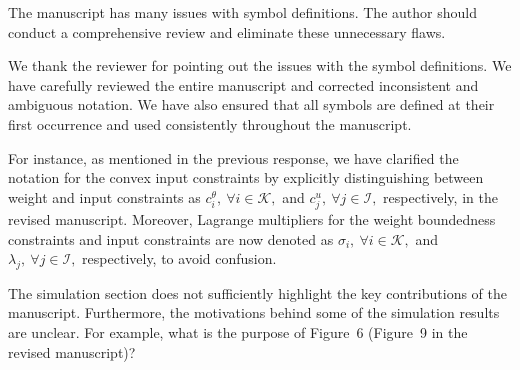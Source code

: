\documentclass[12pt,english]{reviewresponse}
\begin{document}
% 
\begin{revcomment}[3][1]{}
	The manuscript has many issues with symbol definitions. The author should conduct a comprehensive review and eliminate these unnecessary flaws.
\end{revcomment}

\begin{revresponse}
  We thank the reviewer for pointing out the issues with the symbol definitions. 
  We have carefully reviewed the entire manuscript and corrected inconsistent and ambiguous notation. 
  We have also ensured that all symbols are defined at their first occurrence and used consistently throughout the manuscript.

  \bigskip

  For instance, as mentioned in the previous response, we have clarified the notation for the convex input constraints by explicitly distinguishing between weight and input constraints as $c_i^\theta,\ \forall i\in\mathcal{K},$ and $c_j^u,\ \forall j\in\mathcal{I},$ respectively, in the revised manuscript.
  Moreover, Lagrange multipliers for the weight boundedness constraints and input constraints are now denoted as $\sigma_i,\ \forall i\in\mathcal{K},$ and $\lambda_j,\ \forall j\in\mathcal{I},$ respectively, to avoid confusion.
\end{revresponse}

% 
\begin{revcomment}[1][1]{}
	The simulation section does not sufficiently highlight the key contributions of the manuscript. Furthermore, the motivations behind some of the simulation results are unclear. For example, what is the purpose of Figure~6 (Figure~9 in the revised manuscript)?
\end{revcomment}
\end{document}
